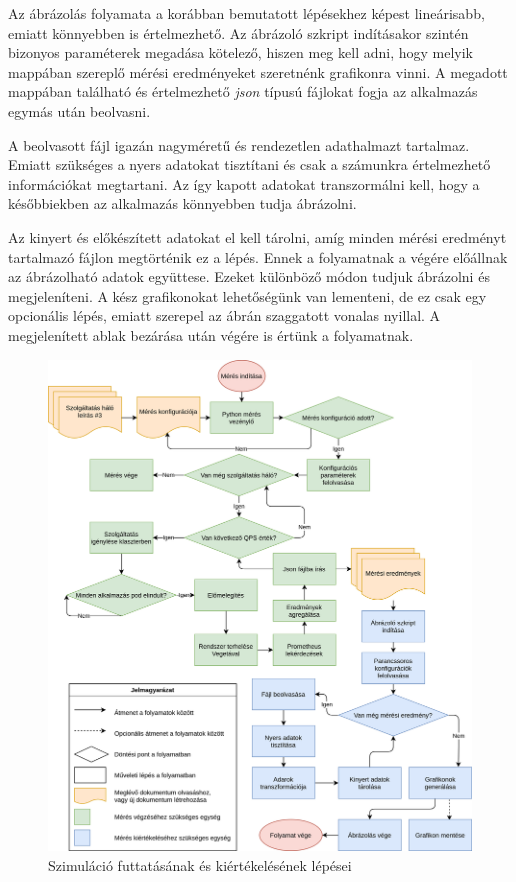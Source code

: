 Az ábrázolás folyamata a korábban bemutatott lépésekhez képest lineárisabb, emiatt könnyebben is értelmezhető.
Az ábrázoló szkript indításakor szintén bizonyos paraméterek megadása kötelező, hiszen meg kell adni, hogy melyik mappában szereplő mérési eredményeket szeretnénk grafikonra vinni.
A megadott mappában található és értelmezhető \textit{json} típusú fájlokat fogja az alkalmazás egymás után beolvasni.

A beolvasott fájl igazán nagyméretű és rendezetlen adathalmazt tartalmaz.
Emiatt szükséges a nyers adatokat tisztítani és csak a számunkra értelmezhető információkat megtartani.
Az így kapott adatokat transzormálni kell, hogy a későbbiekben az alkalmazás könnyebben tudja ábrázolni.

Az kinyert és előkészített adatokat el kell tárolni, amíg minden mérési eredményt tartalmazó fájlon megtörténik ez a lépés. 
Ennek a folyamatnak a végére előállnak az ábrázolható adatok együttese.
Ezeket különböző módon tudjuk ábrázolni és megjeleníteni.
A kész grafikonokat lehetőségünk van lementeni, de ez csak egy opcionális lépés, emiatt szerepel az ábrán szaggatott vonalas nyillal.
A megjelenített ablak bezárása után végére is értünk a folyamatnak.

\begin{figure}[!ht]
\centering
\includegraphics[width=150mm, keepaspectratio]{figures/measurement_and_draw_workflow.png}
\caption{Szimuláció futtatásának és kiértékelésének lépései}
\label{fig:measurement_and_draw_workflow}
\end{figure}

